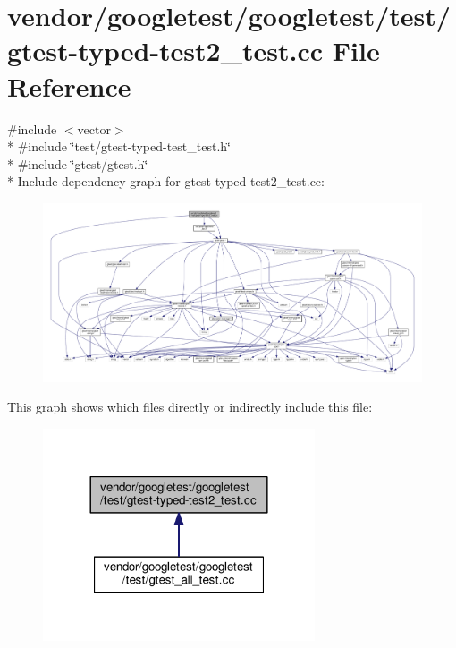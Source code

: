 \hypertarget{gtest-typed-test2__test_8cc}{}\section{vendor/googletest/googletest/test/gtest-\/typed-\/test2\+\_\+test.cc File Reference}
\label{gtest-typed-test2__test_8cc}
{\ttfamily \#include $<$vector$>$}\\*
{\ttfamily \#include \char`\"{}test/gtest-\/typed-\/test\+\_\+test.\+h\char`\"{}}\\*
{\ttfamily \#include \char`\"{}gtest/gtest.\+h\char`\"{}}\\*
Include dependency graph for gtest-\/typed-\/test2\+\_\+test.cc\+:\nopagebreak
\begin{figure}[H]
\begin{center}
\leavevmode
\includegraphics[width=350pt]{gtest-typed-test2__test_8cc__incl}
\end{center}
\end{figure}
This graph shows which files directly or indirectly include this file\+:\nopagebreak
\begin{figure}[H]
\begin{center}
\leavevmode
\includegraphics[width=228pt]{gtest-typed-test2__test_8cc__dep__incl}
\end{center}
\end{figure}
